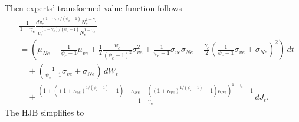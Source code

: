 \documentclass[12 pt, oneside]{article}
\theoremstyle{definition}
\theoremstyle{definition}
\theoremstyle{definition}
\begin{document}
Then experts' transformed value function follows
\begin{align*}
& \frac{1}{1  - \gamma_e}  \frac{dv_e^{(1 - \gamma_e) / (\psi_e - 1)}N_e^{1 - \gamma_e}}{v_e^{(1 - \gamma_e) / (\psi_e - 1)}N_e^{1 - \gamma_e}} \\
& =  \left(\mu_{Ne} + \frac{1}{\psi_e - 1}\mu_{ve} + \frac{1}{2}\frac{\psi_e}{(\psi_e - 1)^2}\sigma_{ve}^2 + \frac{1}{\psi_e - 1}\sigma_{ve}\sigma_{Ne} - \frac{\gamma_e}{2} \left(\frac{1}{\psi_e - 1}\sigma_{ve} + \sigma_{Ne}\right)^2 \right)\, dt\\
                                          &\quad + \left(\frac{1}{\psi_e - 1}\sigma_{ve} + \sigma_{Ne}\right)\, dW_t \\
                                          &\quad + \frac{(1 +  ((1 + \kappa_{ve})^{1 / (\psi_e - 1)} - 1) - \kappa_{Ne} - ((1 + \kappa_{ve})^{1 / (\psi_e - 1)} - 1)\kappa_{Ne})^{1 - \gamma_e} - 1}{1 - \gamma_e}\, dJ_t.
\end{align*}
The HJB simplifies to
\end{document}
